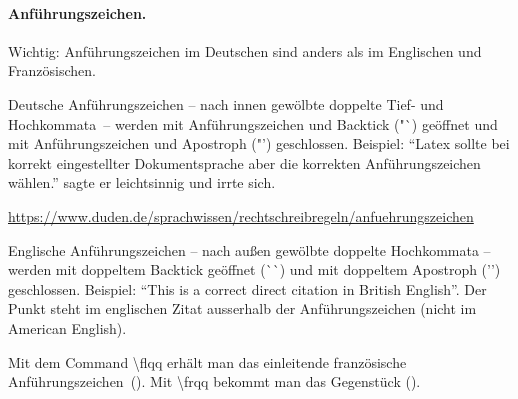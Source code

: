 \paragraph{Anführungszeichen.}
Wichtig: Anführungszeichen im Deutschen sind anders als im Englischen und Französischen. 

Deutsche Anführungszeichen -- nach innen gewölbte doppelte Tief- und Hochkommata~-- werden mit Anführungszeichen und Backtick ("{}\`{}) geöffnet und mit Anführungszeichen und Apostroph ("{}'{}) geschlossen.
Beispiel: 
"`Latex sollte bei korrekt eingestellter Dokumentsprache aber die korrekten Anführungszeichen wählen."' sagte er leichtsinnig und irrte sich.

\url{https://www.duden.de/sprachwissen/rechtschreibregeln/anfuehrungszeichen}


Englische Anführungszeichen -- nach außen gewölbte doppelte Hochkommata -- werden mit doppeltem Backtick geöffnet (\`{}\`{}) und mit doppeltem Apostroph ('{}'{}) geschlossen. Beispiel:
``This is a correct direct citation in British English''. Der Punkt steht im englischen Zitat ausserhalb der Anführungszeichen (nicht im American English).

Mit dem Command \textbackslash flqq erhält man das einleitende französische Anführungszeichen~(\flqq). Mit \textbackslash frqq{} bekommt man das Gegenstück (\frqq).